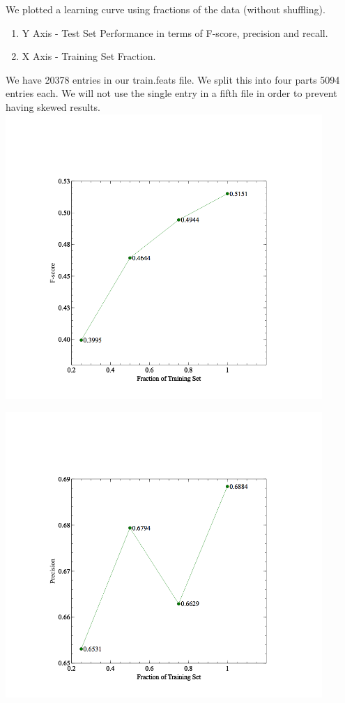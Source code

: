 \documentclass[a4paper]{article}
\begin{document}
We plotted a learning curve using fractions of the data (without shuffling). \\

\begin {enumerate}
\item Y Axis - Test Set Performance in terms of F-score, precision and recall. 
\item X Axis - Training Set Fraction. 
\end {enumerate}


We have 20378 entries in our train.feats file. We split this into four parts 5094 entries each. We will not use the single entry in a fifth file in order to prevent having skewed results. \\

{
\centering
\includegraphics[width=0.90\textwidth,trim=2cm 1cm 2cm 2cm,clip]{f-score.png}
}


{
\centering
\includegraphics[width=0.90\textwidth,trim=2cm 1cm 2cm 2cm,clip]{frac-prec.png}
}
\end{document}
